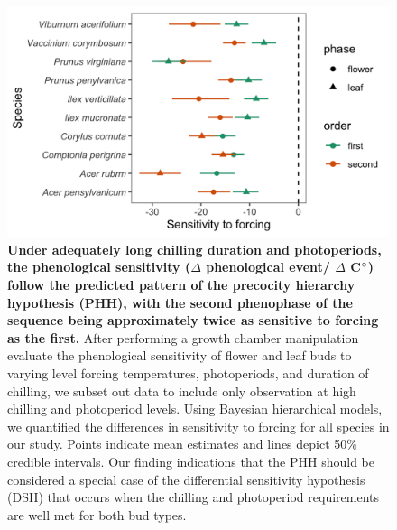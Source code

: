 \documentclass[11pt]{article}\usepackage[]{graphicx}\usepackage[]{color}
\begin{document}
\begin{figure}[h!]
    \centering
         \includegraphics[width=.8\textwidth]{..//Plots/Flobuds_manuscript_figs/phh_plot.png}
    \caption{\textbf{Under adequately long chilling duration and photoperiods, the phenological sensitivity ($\Delta$ phenological event/ $\Delta$ C$\degree$) follow the predicted pattern of the precocity hierarchy hypothesis (PHH), with the second phenophase of the sequence being approximately twice as sensitive to forcing as the first.} After performing a growth chamber manipulation evaluate the phenological sensitivity of flower and leaf buds to varying level forcing temperatures, photoperiods, and duration of chilling, we subset out data to include only observation at high chilling and photoperiod levels. Using Bayesian hierarchical models, we quantified the differences in sensitivity to forcing for all species in our study. Points indicate mean estimates and lines depict 50\% credible intervals. Our finding indications that the PHH should be considered a special case of the differential sensitivity hypothesis (DSH) that occurs when the chilling and photoperiod requirements are well met for both bud types.}
    \label{fig:phh}
\end{figure}
\end{document}
